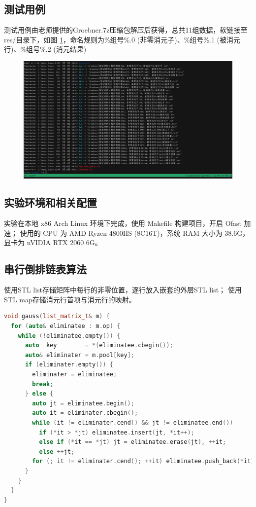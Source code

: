 \documentclass[a4paper]{article}
\begin{document}
\subsection{测试用例}
测试用例由老师提供的Groebner.7z压缩包解压后获得，总共11组数据，软链接至res/目录下，如图 \ref{pic:dir}，命名规则为\%组号\%.0 (非零消元子)、\%组号\%.1 (被消元行)、\%组号\%.2 (消元结果)
\begin{figure}
  \centering
  \includegraphics[width=1\textwidth]{dir.png}
  \label{pic:dir}
\end{figure}

\subsection{实验环境和相关配置}
实验在本地 x86 Arch Linux 环境下完成，使用 Makefile 构建项目，开启 Ofast 加速；
使用的 CPU 为 AMD Ryzen 4800HS (8C16T)，系统 RAM 大小为 38.6G，显卡为 nVIDIA RTX 2060 6G。

\subsection{串行倒排链表算法}
使用STL list存储矩阵中每行的非零位置，逐行放入嵌套的外层STL list；
使用STL map存储消元行首项与消元行的映射。

\begin{lstlisting}[frame=trbl, language={C++}, caption={串行倒排链表消元部分}]
void gauss(list_matrix_t& m) {
  for (auto& eliminatee : m.op) {
    while (!eliminatee.empty()) {
      auto  key        = *(eliminatee.cbegin());
      auto& eliminater = m.pool[key];
      if (eliminater.empty()) {
        eliminater = eliminatee;
        break;
      } else {
        auto jt = eliminatee.begin();
        auto it = eliminater.cbegin();
        while (it != eliminater.cend() && jt != eliminatee.end())
          if (*it > *jt) eliminatee.insert(jt, *it++);
          else if (*it == *jt) jt = eliminatee.erase(jt), ++it;
          else ++jt;
        for (; it != eliminater.cend(); ++it) eliminatee.push_back(*it);
      }
    }
  }
}
\end{lstlisting}
\end{document}
